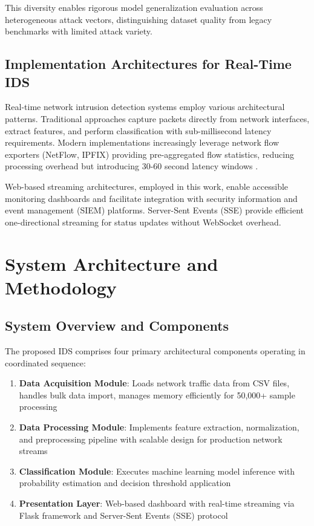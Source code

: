 \documentclass[conference]{IEEEtran}
\begin{document}
This diversity enables rigorous model generalization evaluation across heterogeneous attack vectors, distinguishing dataset quality from legacy benchmarks with limited attack variety.

\subsection{Implementation Architectures for Real-Time IDS}

Real-time network intrusion detection systems employ various architectural patterns. Traditional approaches capture packets directly from network interfaces, extract features, and perform classification with sub-millisecond latency requirements. Modern implementations increasingly leverage network flow exporters (NetFlow, IPFIX) providing pre-aggregated flow statistics, reducing processing overhead but introducing 30-60 second latency windows \cite{ref20}.

Web-based streaming architectures, employed in this work, enable accessible monitoring dashboards and facilitate integration with security information and event management (SIEM) platforms. Server-Sent Events (SSE) provide efficient one-directional streaming for status updates without WebSocket overhead.

\section{System Architecture and Methodology}

\subsection{System Overview and Components}

The proposed IDS comprises four primary architectural components operating in coordinated sequence:

\begin{enumerate}
    \item \textbf{Data Acquisition Module}: Loads network traffic data from CSV files, handles bulk data import, manages memory efficiently for 50,000+ sample processing
    \item \textbf{Data Processing Module}: Implements feature extraction, normalization, and preprocessing pipeline with scalable design for production network streams
    \item \textbf{Classification Module}: Executes machine learning model inference with probability estimation and decision threshold application
    \item \textbf{Presentation Layer}: Web-based dashboard with real-time streaming via Flask framework and Server-Sent Events (SSE) protocol
\end{enumerate}
\end{document}
